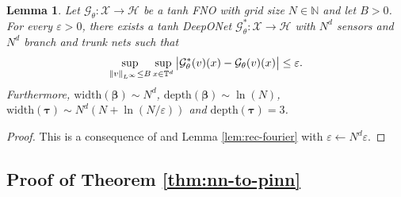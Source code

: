 \documentclass{article}
\numberwithin{equation}{section}
\newcommand{\width}{\mathrm{width}}
\newcommand{\depth}{\mathrm{depth}}
\newcommand{\T}{\mathbb{T}}
\newcommand{\N}{\mathbb{N}}
\newcommand{\cG}{\mathcal{G}}
\newcommand{\cH}{\mathcal{H}}
\newcommand{\cX}{\mathcal{X}}
\newcommand{\trunk}{{\bm{\tau}}}
\newcommand{\branch}{{\bm{\beta}}}
\renewcommand{\epsilon}{\varepsilon}
\newcommand{\1}{\mathbbm{1}}
\newtheorem{lemma}[theorem]{Lemma}
\begin{document}
\begin{lemma}\label{lem:equivalence}
Let $\cG_\theta:\cX \to \cH$ be a tanh FNO with grid size $N\in\N$ and let $B>0$. For every $\epsilon>0$, there exists a tanh DeepONet $\cG_\theta^*: \cX\to\cH$ with $N^d$ sensors and $N^d$ branch and trunk nets such that
\begin{equation}
    \sup_{\norm{v}_{L^\infty}\leq B}\sup_{x \in \T^d} \abs{\cG_\theta^*(v)(x)-\cG_\theta(v)(x)}\leq \epsilon. 
\end{equation}
Furthermore, $\width(\branch) \sim N^d$, $\depth(\branch) \sim \ln(N)$, $\width(\trunk) \sim N^{d}(N+\ln(N/\epsilon))$ and $\depth(\trunk) = 3$. 
\end{lemma}
\begin{proof}
This is a consequence of \cite[Theorem 36]{kovachki2021universal} and Lemma \ref{lem:rec-fourier} with $\epsilon\leftarrow N^d\epsilon$. 
\end{proof}

\subsection{Proof of Theorem \ref{thm:nn-to-pinn}}\label{app:nn-to-pinn}
\end{document}
